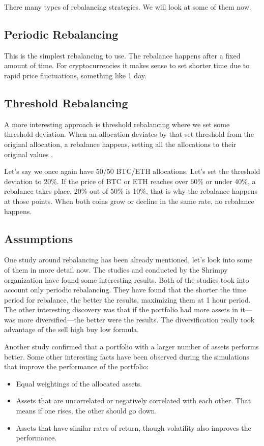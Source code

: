 There many types of rebalancing strategies. We will look at some of them now.

\subsection*{Periodic Rebalancing}
This is the simplest rebalancing to use. The rebalance happens after a fixed amount of time. For cryptocurrencies it makes sense to set shorter time due to rapid price fluctuations, something like 1 day.

\subsection*{Threshold Rebalancing}
A more interesting approach is threshold rebalancing where we set some threshold deviation. When an allocation deviates by that set threshold from the original allocation, a rebalance happens, setting all the allocations to their original values \cite{portfolio-rebalancing}.

Let's say we once again have 50/50 BTC/ETH allocations. Let's set the threshold deviation to $20\%$. If the price of BTC or ETH reaches over 60\% or under 40\%, a rebalance takes place. 20\% out of 50\% is 10\%, that is why the rebalance happens at those points. When both coins grow or decline in the same rate, no rebalance happens.

\subsection*{Assumptions}
One study around rebalancing has been already mentioned, let's look into some of them in more detail now. The studies \cite{portfolio-diversity} and \cite{diversify-perform-better} conducted by the Shrimpy organization have found some interesting results. Both of the studies took into account only periodic rebalancing. They have found that the shorter the time period for rebalance, the better the results, maximizing them at 1 hour period. The other interesting discovery was that if the portfolio had more assets in it---was more diversified---the better were the results. The diversification really took advantage of the sell high buy low formula.

Another study \cite{rebalancing-strategy} confirmed that a portfolio with a larger number of assets performs better. Some other interesting facts have been observed during the simulations that improve the performance of the portfolio:
\begin{itemize}
    \item Equal weightings of the allocated assets.
    \item Assets that are uncorrelated or negatively correlated with each other. That means if one rises, the other should go down.
    \item Assets that have similar rates of return, though volatility also improves the performance.
\end{itemize}

